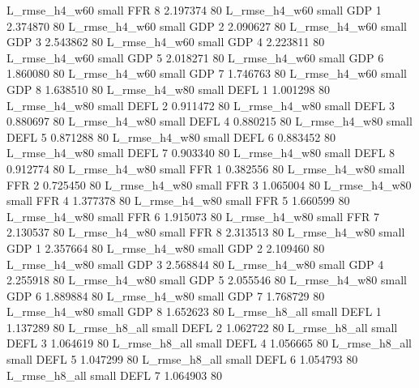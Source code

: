  L_rmse_h4_w60      small      FFR                 8 2.197374 80
 L_rmse_h4_w60      small      GDP                 1 2.374870 80
 L_rmse_h4_w60      small      GDP                 2 2.090627 80
 L_rmse_h4_w60      small      GDP                 3 2.543862 80
 L_rmse_h4_w60      small      GDP                 4 2.223811 80
 L_rmse_h4_w60      small      GDP                 5 2.018271 80
 L_rmse_h4_w60      small      GDP                 6 1.860080 80
 L_rmse_h4_w60      small      GDP                 7 1.746763 80
 L_rmse_h4_w60      small      GDP                 8 1.638510 80
 L_rmse_h4_w80      small     DEFL                 1 1.001298 80
 L_rmse_h4_w80      small     DEFL                 2 0.911472 80
 L_rmse_h4_w80      small     DEFL                 3 0.880697 80
 L_rmse_h4_w80      small     DEFL                 4 0.880215 80
 L_rmse_h4_w80      small     DEFL                 5 0.871288 80
 L_rmse_h4_w80      small     DEFL                 6 0.883452 80
 L_rmse_h4_w80      small     DEFL                 7 0.903340 80
 L_rmse_h4_w80      small     DEFL                 8 0.912774 80
 L_rmse_h4_w80      small      FFR                 1 0.382556 80
 L_rmse_h4_w80      small      FFR                 2 0.725450 80
 L_rmse_h4_w80      small      FFR                 3 1.065004 80
 L_rmse_h4_w80      small      FFR                 4 1.377378 80
 L_rmse_h4_w80      small      FFR                 5 1.660599 80
 L_rmse_h4_w80      small      FFR                 6 1.915073 80
 L_rmse_h4_w80      small      FFR                 7 2.130537 80
 L_rmse_h4_w80      small      FFR                 8 2.313513 80
 L_rmse_h4_w80      small      GDP                 1 2.357664 80
 L_rmse_h4_w80      small      GDP                 2 2.109460 80
 L_rmse_h4_w80      small      GDP                 3 2.568844 80
 L_rmse_h4_w80      small      GDP                 4 2.255918 80
 L_rmse_h4_w80      small      GDP                 5 2.055546 80
 L_rmse_h4_w80      small      GDP                 6 1.889884 80
 L_rmse_h4_w80      small      GDP                 7 1.768729 80
 L_rmse_h4_w80      small      GDP                 8 1.652623 80
 L_rmse_h8_all      small     DEFL                 1 1.137289 80
 L_rmse_h8_all      small     DEFL                 2 1.062722 80
 L_rmse_h8_all      small     DEFL                 3 1.064619 80
 L_rmse_h8_all      small     DEFL                 4 1.056665 80
 L_rmse_h8_all      small     DEFL                 5 1.047299 80
 L_rmse_h8_all      small     DEFL                 6 1.054793 80
 L_rmse_h8_all      small     DEFL                 7 1.064903 80
